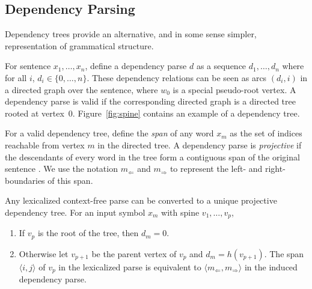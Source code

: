\documentclass[11pt,letterpaper]{article}
\newcommand{\Left}[1]{#1_{\Leftarrow}}
\newcommand{\Right}[1]{#1_{\Rightarrow}}
\newcommand{\Span}[1]{\langle #1 \rangle}
\begin{document}
\subsection{Dependency Parsing}

Dependency trees provide an alternative, and in some sense simpler,
representation of grammatical structure.


For sentence $x_1,
\ldots, x_n$, define a dependency parse $d$ as a sequence $d_1, \ldots, d_n$ where for all $i$, $d_i \in \{0, \ldots, n\}$. These dependency relations can be seen as arcs $(d_i, i)$ in a directed graph over the sentence, where $w_0$ is a special pseudo-root vertex.  A dependency parse is valid  if the corresponding directed graph is a directed tree rooted at vertex~$0$. Figure~\ref{fig:spine} contains an example of a dependency tree.

For a valid dependency tree, define the \textit{span} of any word $x_m$ as the set of indices reachable from vertex $m$ in the directed tree. A dependency parse is \textit{projective} if the descendants of every word in the tree form a contiguous span of the original sentence \cite{}. We use the notation $\Left{m}$ and $\Right{m}$ to represent the left- and
right-boundaries of this span.









Any lexicalized context-free parse can be converted to a unique projective dependency tree.
For an input symbol $x_m$ with spine $v_1, \ldots, v_p$,

\begin{enumerate}
\item If $v_p$ is the root of the tree,
then $d_m = 0$.
\item Otherwise let $v_{p+1}$ be the parent vertex of
$v_p$ and $d_m = h(v_{p+1})$. The span $\Span{i, j}$ of $v_p$ in the lexicalized parse is equivalent to $\Span{\Left{m}, \Right{m}}$
in the induced dependency parse.
\end{enumerate}
\end{document}
